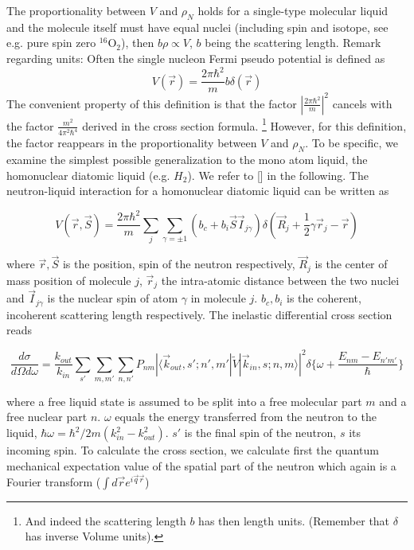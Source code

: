 \documentclass[11pt,a4paper]{article}
\begin{document}
The proportionality between $V$ and $\rho_N$ holds for a single-type molecular liquid and the molecule itself
must have equal nuclei (including spin and isotope, see e.g. pure spin zero $^{16}$O$_2$), then $b\rho \propto V$, $b$ being the scattering length.
\newline
Remark regarding units: Often the single nucleon Fermi pseudo potential is defined as 
\begin{equation}
V(\vec r) = \frac{2 \pi \hbar^2}{m} b \delta(\vec r)
\end{equation}
The convenient property of this definition is that the factor  $|\frac{2 \pi \hbar^2}{m}|^2$ cancels with the factor 
$\frac{m^2}{4 \pi^2 \hbar^4}$ derived in the cross section formula. 
\footnote{And indeed the scattering length $b$ has then length units. (Remember that $\delta$ has inverse Volume units).}
However, for this definition, the factor reappears in the proportionality between $V$ and $\rho_N$.
\newline
To be specific, we examine the simplest possible generalization to the mono atom liquid, the homonuclear diatomic liquid 
(e.g. $H_2$). We refer to [\cite{sears}] in the following. The neutron-liquid interaction for a homonuclear diatomic liquid can be written as


\begin{equation}
V(\vec r, \vec S) = \frac{2 \pi \hbar^2}{ m}
\sum_{j} \sum_{\gamma = \pm 1} (b_c + b_i \vec S \vec I_{j \gamma}) \delta(\vec R_j + \frac{1}{2} \gamma \vec r_j - \vec r)
\end{equation}

where $\vec r, \vec S$ is the position, spin of the neutron respectively, $\vec R_j$ is the center of mass position of molecule $j$, $\vec r_j$
the intra-atomic distance between the two nuclei and $\vec I_{j \gamma}$ is the nuclear spin of atom $\gamma$ in molecule $j$. 
$b_c, b_i$ is the coherent, incoherent scattering length respectively. The inelastic differential cross section reads

\begin{equation}
\frac{d \sigma}{ d \Omega d \omega} =
\frac{k_{out}}{k_{in}}
\sum_{s' }\sum_{m,m'} \sum_{n,n'} P_{nm} | \langle \vec k_{out}, s'; n', m' | \tilde V | \vec k_{in}, s; n, m \rangle |^2
\delta \bigl\{ \omega + \frac{ E_{nm} - E_{n'm'} } {\hbar} \bigr\}
\end{equation}

where a free liquid state is assumed to be split into a free molecular part $m$ and a free nuclear part $n$. $\omega$
equals the energy transferred from the neutron to the liquid, $\hbar \omega = \hbar^2 /2m (k_{in}^2 - k_{out}^2)$. 
$s'$ is the final spin of the neutron, $s$ its incoming spin. \newline
To calculate the cross section, we calculate first the quantum mechanical expectation value of the spatial
part of the neutron which again is a Fourier transform ($ \int d \vec r e^{i\vec q \vec r}$) 
\end{document}
